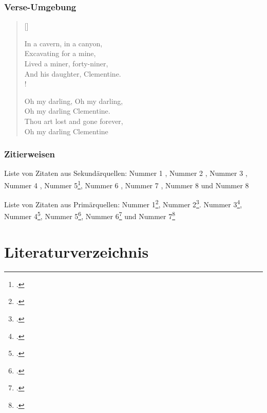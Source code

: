 \documentclass[12pt]{scrreprt}
\begin{document}
\subsection{Verse-Umgebung}
\settowidth{\versewidth}{In a cavern, in a canyon,}
\begin{verse}[\versewidth]
\begin{altverse}
 In a cavern, in a canyon, \\
Excavating for a mine, \\
Lived a miner, forty-niner, \label{vs:49} \\
And his daughter, Clementine. \\!
\end{altverse}

\begin{altverse}
 Oh my darling, Oh my darling, \\
Oh my darling Clementine. \\
Thou art lost and gone forever, \\
Oh my darling Clementine
\end{altverse}

\end{verse}
\subsection{Zitierweisen}
Liste von Zitaten aus Sekundärquellen: Nummer 1 \parencite[][56-59]{Culler1997}, Nummer 2 \parencite[][103]{Baugh2002} , Nummer 3 \cite*[][]{Schabert2000}, Nummer 4 \Cite[][]{Crenshaw1995} , Nummer 5\footcite[][2: 117]{Huehn1995}, Nummer 6 \textcite[][290-297]{Kastovsky1992}, Nummer 7 \parencite[][587]{Wimsatt1959},  Nummer 8 \parencite[][5]{Jones1989} und Nummer 8 \parencite{Willey2003}

Liste von Zitaten aus Primärquellen: Nummer 1\footcite[][35]{Banville2005}, Nummer 2\footcite[][56]{Austen1813}. Nummer 3\footcite[][72]{Wrenn1996}, Nummer 4\footcite[][117]{McEwan1975}, Nummer 5\footcite[][1. 11-16]{Eliot2000}, Nummer 6\footcite[][1.5.189-190]{Shakespeare1985} und Nummer 7\footcite[][1:14:12]{Coppola1992}
\chapter{Literaturverzeichnis}
\printbibliography[keyword=Primaerquelle,heading=subbibliography,title={Primärquellen}]
\printbibliography[keyword=Sekundaerquelle,heading=subbibliography,title={Sekundärquellen}]
\end{document}
